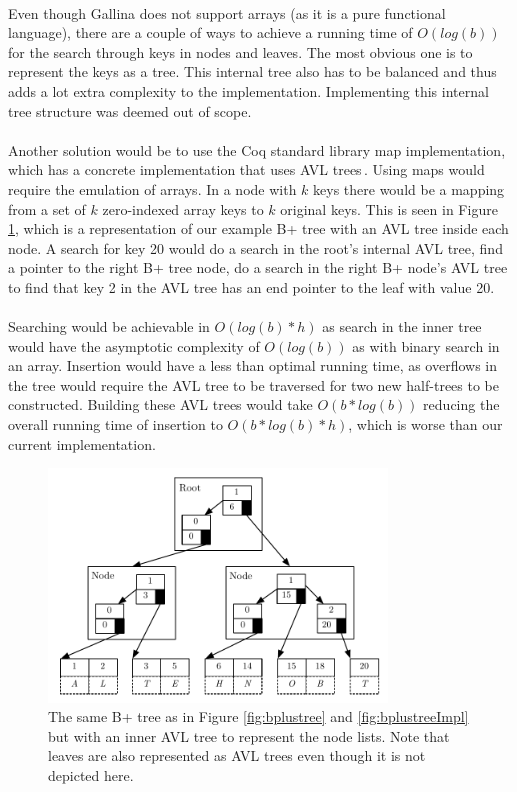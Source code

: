 \paragraph{}
Even though Gallina does not support arrays (as it is a pure functional language), there are a couple of ways to achieve a running time of $O(log(b))$ for the search through keys in nodes and leaves. The most obvious one is to represent the keys as a tree. This internal tree also has to be balanced and thus adds a lot extra complexity to the implementation. Implementing this internal tree structure was deemed out of scope. 
\paragraph{}
Another solution would be to use the Coq standard library map implementation, which has a concrete implementation that uses AVL trees\,\cite{fmapavl}. Using maps would require the emulation of arrays. In a node with $k$ keys there would be a mapping from a set of $k$ zero-indexed array keys to $k$ original keys. This is seen in Figure \ref{fig:bplustreeAVLImpl}, which is a representation of our example B+ tree with an AVL tree inside each node. A search for key 20 would do a search in the root's internal AVL tree, find a pointer to the right B+ tree node, do a search in the right B+ node's AVL tree to find that key 2 in the AVL tree has an end pointer to the leaf with value 20. 
\paragraph{}
Searching would be achievable in $O(log(b)*h)$ as search in the inner tree would have the asymptotic complexity of $O(log(b))$ as with binary search in an array. Insertion would have a less than optimal running time, as overflows in the tree would require the AVL tree to be traversed for two new half-trees to be constructed. Building these AVL trees would take $O(b*log(b))$ reducing the overall running time of insertion to $O(b*log(b)*h)$, which is worse than our current implementation.

\begin{figure}
 \centering
   \includegraphics[width=90mm]{diagrams/BPlusTreeMapImpl.pdf}
 \caption{The same B+ tree as in Figure \ref{fig:bplustree} and \ref{fig:bplustreeImpl} but with an inner AVL tree to represent the node lists. Note that leaves are also represented as AVL trees even though it is not depicted here.}
 \label{fig:bplustreeAVLImpl}
\end{figure}

